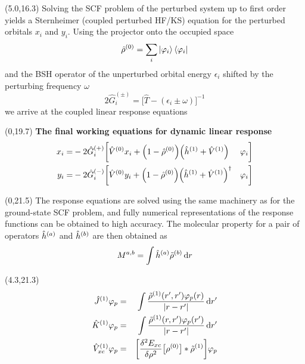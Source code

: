 \documentclass[a0,draft,portrait]{a0poster}
\begin{document}
\begin{textblock}{4.3}(5.0,16.3)
Solving the SCF problem of the perturbed system up to first order yields a
Sternheimer\cite{Mahan} (coupled perturbed HF/KS) equation for the perturbed 
orbitals $x_i$ and $y_i$. Using the projector onto the occupied space
\begin{equation}
    \hat{\rho}^{(0)} = \sum_i \ket{\varphi_i}\bra{\varphi_i}
\end{equation}
and the BSH operator of the unperturbed orbital energy $\epsilon_i$ shifted by 
the perturbing frequency $\omega$
\begin{equation}
    2\hat{G}_i^{(\pm)} = \big[\hat{T} - (\epsilon_i \pm \omega)\big]^{-1} 
\end{equation}
we arrive at the coupled linear response equations\cite{Sekino,Yanai}
\end{textblock}

\begin{textblock}{9.3}(0,19.7)
\centering
\textbf{The final working equations for dynamic linear response}
\begin{eqnarray}
    \label{eq:x}
    x_i =& -2 \hat{G}_i^{(+)}\bigg[
    \hat{V}^{(0)}x_i +
    \Big(1 - \hat{\rho}^{(0)}\Big)
    \Big(\hat{h}^{(1)} + \hat{V}^{(1)}\Big)&\varphi_i\bigg]\\
    \label{eq:y}
    y_i =& -2 \hat{G}_i^{(-)}\bigg[
    \hat{V}^{(0)}y_i +
    \Big(1 - \hat{\rho}^{(0)}\Big)
    \Big(\hat{h}^{(1)} + \hat{V}^{(1)}\Big)^\dag&\varphi_i\bigg]
\end{eqnarray}
\end{textblock}

\begin{textblock}{4.3}(0,21.5)
The response equations are solved using the same machinery as for the 
ground-state SCF problem, and fully numerical representations of the response
functions can be obtained to high accuracy. 
The molecular property for a pair of operators 
$\hat{h}^{(a)}$ and $\hat{h}^{(b)}$ are then obtained as
\begin{equation}
    M^{a,b} = \int \hat{h}^{(a)}\tilde{\rho}^{(b)} \,\mathrm{d} r
\end{equation}
\end{textblock}

\begin{textblock}{5.0}(4.3,21.3)
\begin{eqnarray}
    \hat{J}^{(1)} \varphi_p &=& 
        \int\frac{\tilde{\rho}^{(1)}(r',r')\varphi_p(r)}{|r-r'|} \,\mathrm{d} r' \\
    \hat{K}^{(1)} \varphi_p &=&
        \int\frac{\tilde{\rho}^{(1)}(r,r')\varphi_p(r')}{|r-r'|} \,\mathrm{d} r' \\
    \hat{V}_{xc}^{(1)} \varphi_p &=& 
        \bigg[\frac{\delta^2 E_{xc}}{\delta \rho^2}
        \big[\rho^{(0)}\big]*\tilde{\rho}^{(1)}\bigg] \varphi_p
\end{eqnarray}
\end{textblock}
\end{document}
